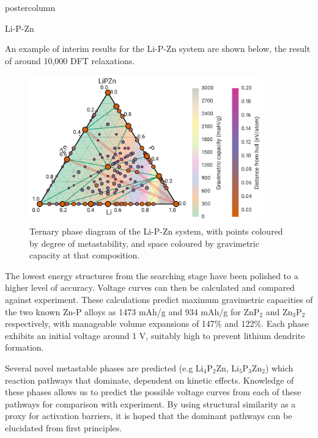 \documentclass{beamer}
\newlength{\columnheight}
\begin{document}
\begin{frame}
\begin{columns}
	\begin{column}{.32\textwidth}
		\begin{beamercolorbox}[center]{postercolumn}
			\begin{minipage}{.98\textwidth} %
				\parbox[t][\columnheight]{\textwidth}{ %
            \begin{myblock}{Li-P-Zn}


          An example of interim results for the Li-P-Zn system are shown below, the result of around 10,000 DFT relaxations.

            \begin{figure}
                \centering
              \includegraphics[width=0.9\textwidth]{img/LiPZn.png}
              \captionsetup{width=0.9\textwidth}
              \caption{Ternary phase diagram of the Li-P-Zn system, with points coloured by degree of metastability, and space coloured by gravimetric capacity at that composition.}
            \end{figure}

            The lowest energy structures from the searching stage have been polished to a higher level of accuracy. Voltage curves can then be calculated and compared against experiment. These calculations predict maximum gravimetric capacities of the two known Zn-P alloys as 1473 mAh/g and 934 mAh/g for ZnP$_2$ and Zn$_3$P$_2$ respectively, with manageable volume expansions of 147\% and 122\%. Each phase exhibits an initial voltage around 1 V, suitably high to prevent lithium dendrite formation.

Several novel metastable phases are predicted (e.g Li$_4$P$_2$Zn, Li$_5$P$_3$Zn$_2$) which reaction pathways that dominate, dependent on kinetic effects. Knowledge of these phases allows us to predict the possible voltage curves from each of these pathways for comparison with experiment. By using structural similarity as a proxy for activation barriers, it is hoped that the dominant pathways can be elucidated from first principles.


\end{myblock}}
\end{minipage}
\end{beamercolorbox}
\end{column}
\end{columns}
\end{frame}
\end{document}
